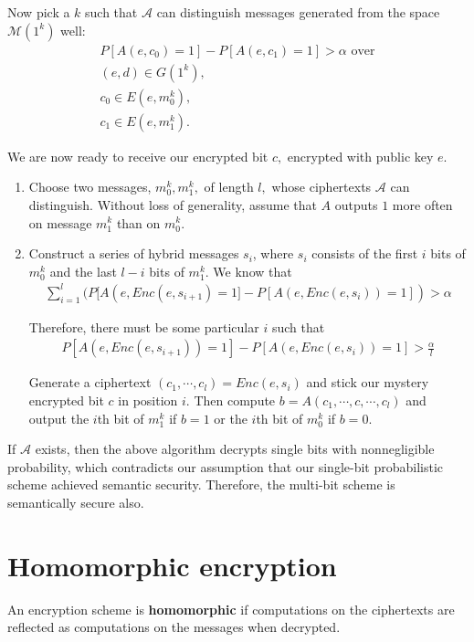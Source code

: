 \documentclass[10pt]{article}
\begin{document}
Now pick a $k$ such that $\mathcal A$ can distinguish messages generated from the space $\mathcal M(1^k)$ well:
\begin{align}
  P[A(e, c_0) = 1] - P[A(e, c_1) = 1] > \alpha \text{ over} \\
  (e,d) \in G(1^k), \\
  c_0 \in E(e, m_0^k), \\
  c_1 \in E(e, m_1^k).
\end{align}

We are now ready to receive our encrypted bit $c,$ encrypted with public key $e$.
\begin{enumerate}
  \item Choose two messages, $m_0^k, m_1^k,$ of length $l,$ whose ciphertexts $\mathcal A$ can distinguish. Without loss of generality, assume that $A$ outputs $1$ more often on message $m_1^k$ than on $m_0^k.$
  \item Construct a series of hybrid messages $s_i$, where $s_i$ consists of the first $i$ bits of $m_0^k$ and the last $l - i$ bits of $m_1^k.$ We know that
  \begin{align}
    \sum_{i = 1}^l (P[A(e, Enc(e, s_{i+1}) = 1] - P[A(e, Enc(e, s_i)) = 1]) > \alpha
  \end{align}
  
  Therefore, there must be some particular $i$ such that
  \begin{align}
    P[A(e, Enc(e, s_{i+1})) = 1] - P[A(e, Enc(e, s_i)) = 1] > \frac{\alpha}{l}
  \end{align}
  
  Generate a ciphertext $(c_1, \cdots, c_l) = Enc(e, s_i)$ and stick our mystery encrypted bit $c$ in position $i$. Then compute $b = A(c_1, \cdots, c, \cdots, c_l)$ and output the $i$th bit of $m_1^k$ if $b = 1$ or the $i$th bit of $m_0^k$ if $b = 0.$
\end{enumerate}

If $\mathcal A$ exists, then the above algorithm decrypts single bits with nonnegligible probability, which contradicts our assumption that our single-bit probabilistic scheme achieved semantic security. Therefore, the multi-bit scheme is semantically secure also. 

\section{Homomorphic encryption}

\begin{definition}An encryption scheme is \textbf{homomorphic} if computations on the ciphertexts are reflected as computations on the messages when decrypted.\end{definition}
\end{document}
